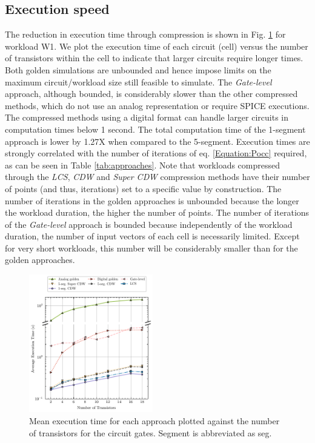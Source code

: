 \subsection{Execution speed}
The reduction in execution time through compression is shown in Fig. \ref{fig:Execution time} for workload W1. We plot the execution time of each circuit (cell) versus the number of transistors within the cell to indicate that larger circuits require longer times. Both golden simulations are unbounded and hence impose limits on the maximum circuit/workload size still feasible to simulate. The \textit{Gate-level} approach, although bounded, is considerably slower than the other compressed methods, which do not use an analog representation or require SPICE executions. The compressed methods using a digital format can handle larger circuits in computation times below 1 second. The total computation time of the 1-segment approach is lower by 1.27X when compared to the 5-segment. Execution times are strongly correlated with the number of iterations of eq. \ref{Equation:Pocc} required, as can be seen in Table \ref{tab:approaches}. Note that workloads compressed through the \textit{LCS}, \textit{CDW} and \textit{Super CDW} compression methods have their number of points (and thus, iterations) set to a specific value by construction. The number of iterations in the golden approaches is unbounded because the longer the workload duration, the higher the number of points. The number of iterations of the \textit{Gate-level} approach is bounded because independently of the workload duration, the number of input vectors of each cell is necessarily limited. Except for very short workloads, this number will be considerably smaller than for the golden approaches.

\begin{figure}[!t]
    \includegraphics[width=0.48\textwidth,trim={0 1mm 0 1mm},clip]{images/ch2/execution_time_report_plot.pdf}
    \caption{Mean execution time for each approach plotted against the number of transistors for the circuit gates. Segment is abbreviated as seg.}
    \label{fig:Execution time}
\end{figure}

